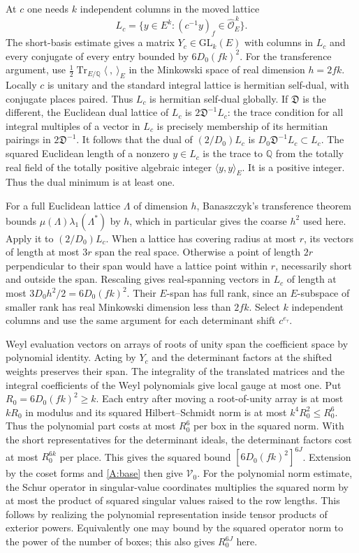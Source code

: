 At $c$ one needs $k$ independent columns in the moved lattice
\[
 L_c=\{y\in E^k:(c^{-1}y)_f\in\widehat{\mathcal O}_E^{\,k}\}.
\]
The short-basis estimate gives a matrix $Y_c\in\mathrm{GL}_k(E)$ with columns in $L_c$ and every conjugate of every entry bounded by $6D_0(fk)^2$. For the transference argument, use $\frac12\operatorname{Tr}_{E/\mathbb Q}\langle\ ,\ \rangle_E$ in the Minkowski space of real dimension $h=2fk$. Locally $c$ is unitary and the standard integral lattice is hermitian self-dual, with conjugate places paired. Thus $L_c$ is hermitian self-dual globally. If $\mathfrak D$ is the different, the Euclidean dual lattice of $L_c$ is $2\mathfrak D^{-1} L_c$: the trace condition for all integral multiples of a vector in $L_c$ is precisely membership of its hermitian pairings in $2\mathfrak D^{-1}$. It follows that the dual of $(2/D_0)L_c$ is $D_0\mathfrak D^{-1} L_c\subset L_c$. The squared Euclidean length of a nonzero $y\in L_c$ is the trace to $\mathbb Q$ from the totally real field of the totally positive algebraic integer $\langle y,y\rangle_E$. It is a positive integer. Thus the dual minimum is at least one.

For a full Euclidean lattice $\Lambda$ of dimension $h$, Banaszczyk's transference theorem~\cite[Theorem~2.2]{banaszczyk} bounds $\mu(\Lambda)\lambda_1(\Lambda^*)$ by $h$, which in particular gives the coarse $h^2$ used here. Apply it to $(2/D_0)L_c$. When a lattice has covering radius at most $r$, its vectors of length at most $3r$ span the real space. Otherwise a point of length $2r$ perpendicular to their span would have a lattice point within $r$, necessarily short and outside the span. Rescaling gives real-spanning vectors in $L_c$ of length at most $3D_0 h^2/2=6D_0(fk)^2$. Their $E$-span has full rank, since an $E$-subspace of smaller rank has real Minkowski dimension less than $2fk$. Select $k$ independent columns and use the same argument for each determinant shift $c^{e_\tau}$.


Weyl evaluation vectors on arrays of roots of unity span the coefficient space by polynomial identity. Acting by $Y_c$ and the determinant factors at the shifted weights preserves their span. The integrality of the translated matrices and the integral coefficients of the Weyl polynomials give local gauge at most one. Put $R_0=6D_0(fk)^2\ge k$. Each entry after moving a root-of-unity array is at most $kR_0$ in modulus and its squared Hilbert--Schmidt norm is at most $k^4R_0^2\le R_0^6$. Thus the polynomial part costs at most $R_0^6$ per box in the squared norm. With the short representatives for the determinant ideals, the determinant factors cost at most $R_0^{6k}$ per place. This gives the squared bound $[6D_0(fk)^2]^{6J}$. Extension by the coset forms and \eqref{A:base} then give $\mathcal V_0$. For the polynomial norm estimate, the Schur operator in singular-value coordinates multiplies the squared norm by at most the product of squared singular values raised to the row lengths. This follows by realizing the polynomial representation inside tensor products of exterior powers. Equivalently one may bound by the squared operator norm to the power of the number of boxes; this also gives $R_0^{6J}$ here.


